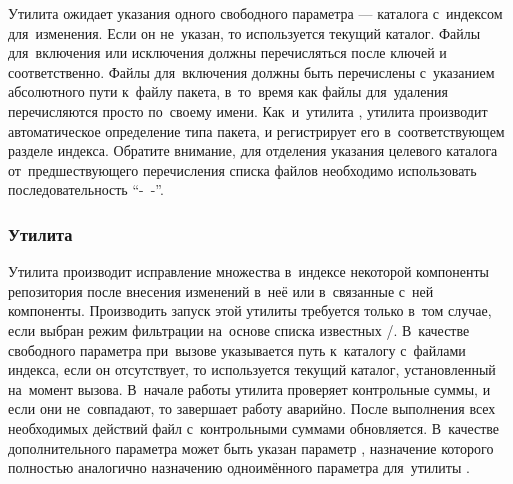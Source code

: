 Утилита  ожидает указания одного свободного параметра --- каталога с~индексом для~изменения.
Если он не~указан, то используется текущий каталог.
Файлы для~включения или исключения должны перечисляться после ключей  и  соответственно.
Файлы для~включения должны быть  перечислены с~указанием абсолютного пути к~файлу пакета, 
в~то~время как файлы для~удаления перечисляются просто по~своему имени.
Как~и~утилита , утилита  производит автоматическое определение типа пакета,
и регистрирует его в~соответствующем разделе индекса.
Обратите внимание, для отделения указания целевого каталога от~предшествующего перечисления  списка файлов необходимо использовать последовательность ``-~-''.

\subsubsection{Утилита }

Утилита  производит исправление множества \provides в~индексе некоторой компоненты репозитория после внесения изменений в~неё 
или в~связанные с~ней компоненты.
Производить запуск этой утилиты требуется только в~том случае, если выбран режим фильтрации \provides на~основе списка известных \requires/\conflicts.
В~качестве свободного параметра при~вызове указывается  путь к~каталогу с~файлами индекса,
если он отсутствует, то используется текущий каталог, установленный на~момент вызова.
В~начале работы утилита  проверяет   контрольные суммы, и если они не~совпадают, то завершает работу аварийно.
После выполнения всех необходимых действий файл с~контрольными суммами обновляется.
В~качестве дополнительного параметра может быть указан параметр , 
назначение которого полностью аналогично назначению одноимённого параметра для~утилиты .
